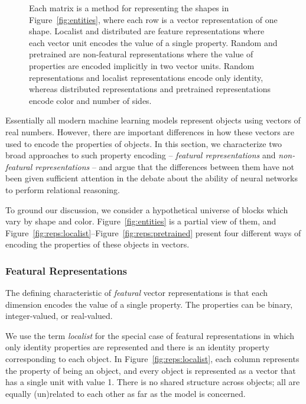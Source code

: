\documentclass{article}
\newcommand{\Figref}[1]{Figure~\ref{#1}}
\newcommand{\figref}[1]{Figure~\ref{#1}}
\newcommand{\tech}[1]{\emph{#1}}
\newcommand{\updatea}[1]{{\color{darkred}#1}}
\begin{document}
\begin{figure}[t!]
  \caption{\updatea{Each matrix is a method for representing the shapes in \figref{fig:entities}, where each row is a vector representation of one shape. Localist and distributed are feature representations where each vector unit encodes the value of a single property. Random and pretrained are non-featural representations where the value of properties are encoded implicitly in two vector units. Random representations and localist representations encode only identity, whereas distributed representations and pretrained representations encode color and number of sides.}}
  \label{fig:reps}
\end{figure}

\updatea{
Essentially all modern machine learning models represent objects using vectors of real numbers. However, there are important differences in how these vectors are used to encode the properties of objects. In this section, we characterize two broad approaches to such property encoding -- \tech{featural representations} and \tech{non-featural representations} -- and argue that the differences between them have not been given sufficient attention in the debate about the ability of neural networks to perform relational reasoning.

To ground our discussion, we consider a hypothetical universe of blocks which vary by shape and color. \Figref{fig:entities} is a partial view of them, and \figref{fig:reps:localist}--\figref{fig:reps:pretrained} present four different ways of encoding the properties of these objects in vectors.

\subsubsection{Featural Representations}

The defining characteristic of \tech{featural} vector representations is that each dimension encodes the value of a single property. The properties can be binary, integer-valued, or real-valued.

We use the term \tech{localist} for the special case of featural representations in which only identity properties are represented and there is an identity property corresponding to each object. In \figref{fig:reps:localist}, each column represents the property of being an object, and every object is represented as a vector that has a single unit with value 1. There is no shared structure across objects; all are equally (un)related to each other as far as the model is concerned.

}
\end{document}

